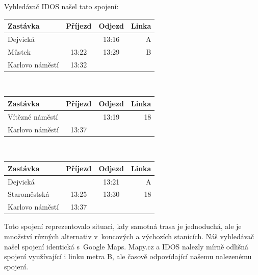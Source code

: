 Vyhledávač IDOS našel tato spojení:\\
\vspace*{-0.5cm}
\begin{center}
\begin{tabular}{|l c c r|}\hline
{\bf Zastávka}&{\bf Příjezd}&{\bf Odjezd}&{\bf Linka}\\\hline
Dejvická&&13:16&A\\
Můstek&13:22&13:29&B\\
Karlovo náměstí&13:32&&\\\hline
\end{tabular}\\[2mm]
\end{center}
\begin{center}
\begin{tabular}{|l c c r|}\hline
{\bf Zastávka}&{\bf Příjezd}&{\bf Odjezd}&{\bf Linka}\\\hline
Vítězné náměstí&&13:19&18\\
Karlovo náměstí&13:37&&\\\hline
\end{tabular}\\[2mm]
\begin{tabular}{|l c c r|}\hline
{\bf Zastávka}&{\bf Příjezd}&{\bf Odjezd}&{\bf Linka}\\\hline
Dejvická&&13:21&A\\
Staroměstská&13:25&13:30&18\\
Karlovo náměstí&13:37&&\\\hline
\end{tabular} 
\end{center}

Toto spojení reprezentovalo situaci, kdy samotná trasa je jednoduchá, ale je
množství různých alternativ v~koncových a výchozích stanicích. Náš vyhledávač
našel spojení identická s~Google Maps. Mapy.cz a IDOS nalezly mírně odlišná
spojení využívající i linku metra B, ale časově odpovídající našemu nalezenému
spojení. 

